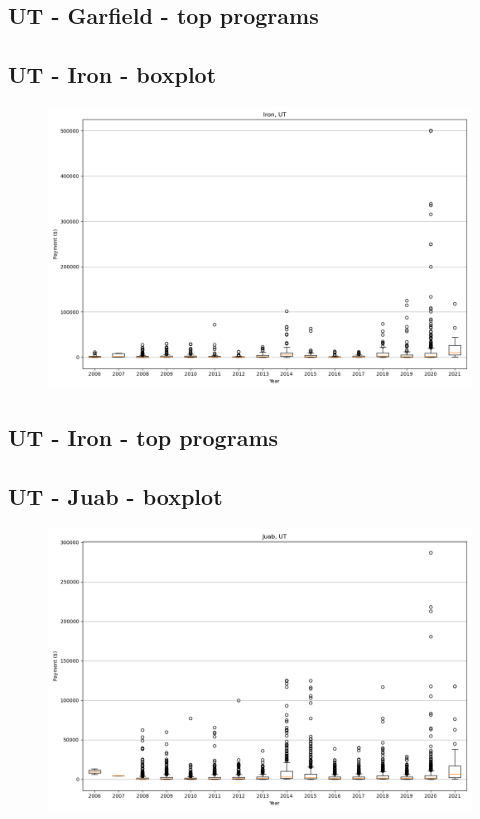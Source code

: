 \subsection*{UT - Garfield - top programs}

\newpage
\subsection*{UT - Iron - boxplot}
\begin{figure}[h]
\centering
\includegraphics[width=7in]{../output/boxplots/counties/Iron-UT_boxplot.png}
\end{figure}


\subsection*{UT - Iron - top programs}

\newpage
\subsection*{UT - Juab - boxplot}
\begin{figure}[h]
\centering
\includegraphics[width=7in]{../output/boxplots/counties/Juab-UT_boxplot.png}
\end{figure}


